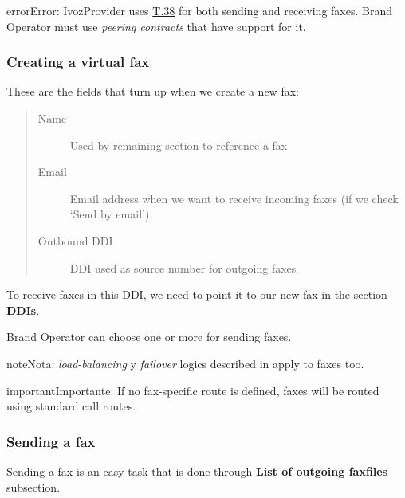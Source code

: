 \documentclass[letterpaper,10pt,spanish]{sphinxmanual}
\begin{document}
\begin{notice}{error}{Error:}
IvozProvider uses
\href{http://www.voip-info.org/wiki/view/T.38}{T.38} for both sending and receiving
faxes. Brand Operator must use \emph{peering contracts} that have support for it.
\end{notice}


\subsubsection{Creating a virtual fax}
\label{administration_portal/client/residential/faxes:creating-a-virtual-fax}
These are the fields that turn up when we create a new fax:
\begin{quote}
\begin{description}
\item[{Name}] \leavevmode
Used by remaining section to reference a fax

\item[{Email}] \leavevmode
Email address when we want to receive incoming faxes (if we check `Send
by email')

\item[{Outbound DDI}] \leavevmode
DDI used as source number for outgoing faxes

\end{description}
\end{quote}

To receive faxes in this DDI, we need to point it to our new fax in the section
\textbf{DDIs}.

Brand Operator can choose one or more {\hyperref[administration_portal/brand/routing/outgoing_routings:outgoing\string-routings]{}} for sending faxes.

\begin{notice}{note}{Nota:}
\emph{load-balancing} y \emph{failover} logics described in {\hyperref[administration_portal/brand/routing/outgoing_routings:outgoing\string-routings]{}}
apply to faxes too.
\end{notice}

\begin{notice}{important}{Importante:}
If no fax-specific route is defined, faxes will be routed using
standard call routes.
\end{notice}


\subsubsection{Sending a fax}
\label{administration_portal/client/residential/faxes:sending-a-fax}
Sending a fax is an easy task that is done through \textbf{List of outgoing faxfiles} subsection.
\end{document}
